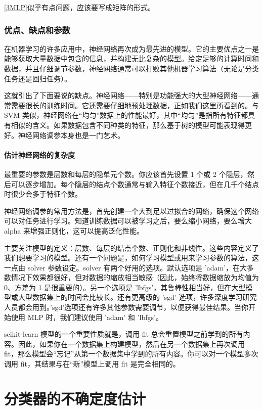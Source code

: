 \autoref{3MLP}似乎有点问题，应该要写成矩阵的形式。
\subsubsection{优点、缺点和参数}
在机器学习的许多应用中，神经网络再次成为最先进的模型。它的主要优点之一是能够获取大量数据中包含的信息，并构建无比复杂的模型。给定足够的计算时间和数据，并且仔细调节参数，神经网络通常可以打败其他机器学习算法（无论是分类任务还是回归任务）。

这就引出了下面要说的缺点。神经网络——特别是功能强大的大型神经网络——通常需要很长的训练时间。它还需要仔细地预处理数据，正如我们这里所看到的。与 SVM 类似，神经网络在“均匀”数据上的性能最好，其中“均匀”是指所有特征都具有相似的含义。如果数据包含不同种类的特征，那么基于树的模型可能表现得更好。神经网络调参本身也是一门艺术。

\paragraph{估计神经网络的复杂度} 最重要的参数是层数和每层的隐单元个数。你应该首先设置 1 个或 2 个隐层，然后可以逐步增加。每个隐层的结点个数通常与输入特征个数接近，但在几千个结点时很少会多于特征个数。

神经网络调参的常用方法是，首先创建一个大到足以过拟合的网络，确保这个网络可以对任务进行学习。知道训练数据可以被学习之后，要么缩小网络，要么增大 alpha 来增强正则化，这可以提高泛化性能。

主要关注模型的定义：层数、每层的结点个数、正则化和非线性。这些内容定义了我们想要学习的模型。还有一个问题是，如何学习模型或用来学习参数的算法，这一点由 solver 参数设定。solver 有两个好用的选项。默认选项是 'adam'，在大多数情况下效果都很好，但对数据的缩放相当敏感（因此，始终将数据缩放为均值为 0、方差为 1 是很重要的）。另一个选项是 'lbfgs'，其鲁棒性相当好，但在大型模型或大型数据集上的时间会比较长。还有更高级的 'sgd' 选项，许多深度学习研究人员都会用到。'sgd'选项还有许多其他参数需要调节，以便获得最佳结果。当你开始使用 MLP 时，我们建议使用 'adam' 和 'lbfgs'。

\begin{tcolorbox}[title=fit 会重置模型]
    scikit-learn 模型的一个重要性质就是，调用 fit 总会重置模型之前学到的所有内容。因此，如果你在一个数据集上构建模型，然后在另一个数据集上再次调用 fit，那么模型会“忘记”从第一个数据集中学到的所有内容。你可以对一个模型多次调用 fit，其结果与在“新”模型上调用 fit 是完全相同的。
\end{tcolorbox}

\section{分类器的不确定度估计}

